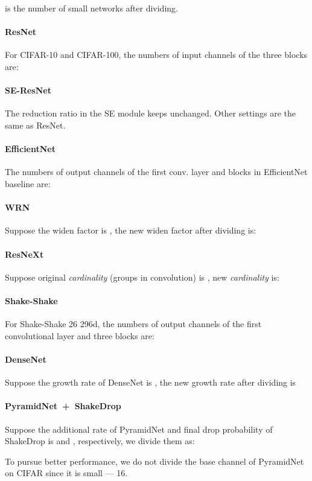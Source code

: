 \documentclass[lettersize,journal]{IEEEtran}
\begin{document}
{
 is the number of small networks after dividing.
\paragraph{ResNet}
For CIFAR-10 and CIFAR-100,
the numbers of input channels of the three blocks are:


\paragraph{SE-ResNet}
The reduction ratio in the SE module keeps unchanged.
Other settings are the same as ResNet.

\paragraph{EfficientNet}
The numbers of output channels of the first conv. layer and
blocks in EfficientNet baseline are:


\paragraph{WRN}
Suppose the widen factor is ,
the new widen factor  after dividing is:


\paragraph{ResNeXt}
Suppose original \textit{cardinality} (groups in convolution) is , 
new \textit{cardinality}  is:




\paragraph{Shake-Shake}
For Shake-Shake 26 296d, the numbers of output channels of the first convolutional 
layer and three blocks are:
	

\paragraph{DenseNet}
Suppose the growth rate of DenseNet is ,
the new growth rate after dividing is



\paragraph{PyramidNet~+~ShakeDrop}
Suppose the additional rate of PyramidNet and final drop probability of ShakeDrop
is  and , respectively, we divide them as:

To pursue better performance, we do not divide the base channel of PyramidNet
on CIFAR since it is small --- 16.

}
\end{document}
